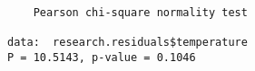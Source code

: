 \begin{verbatim} 

	Pearson chi-square normality test

data:  research.residuals$temperature
P = 10.5143, p-value = 0.1046

\end{verbatim}
